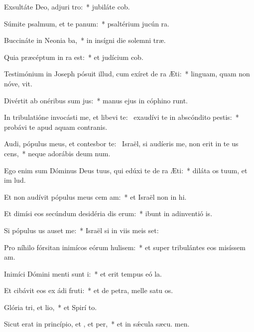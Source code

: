 \item Exsultáte Deo, adjuri tro:~* jubiláte  cob.
\item Súmite psalmum, et te panum:~* psaltérium jucún  ra.
\item Buccináte in Neonia ba,~* in insígni die solemni træ.
\item Quia præcéptum in ra est:~* et judícium  cob.
\item Testimónium in Joseph pósuit illud, cum exíret de ra Æti:~* linguam, quam non nóve, vit.
\item Divértit ab onéribus sum jus:~* manus ejus in cóphino runt.
\item In tribulatióne invocásti me, et libevi te:~\pscross{} exaudívi te in abscóndito pestis:~* probávi te apud aquam contranis.
\item Audi, pópulus meus, et contesbor te:~\pscross{} Israël, si audíeris me, non erit in te us cens,~* neque adorábis deum num.
\item Ego enim sum Dóminus Deus tuus, qui edúxi te de ra Æti:~* diláta os tuum, et im lud.
\item Et non audívit pópulus meus cem am:~* et Israël non in hi.
\item Et dimísi eos secúndum desidéria dis erum:~* ibunt in adinventió is.
\item Si pópulus us auset me:~* Israël si in viis meis set:
\item Pro níhilo fórsitan inimícos eórum hulisem:~* et super tribulántes eos misíssem  am.
\item Inimíci Dómini menti sunt i:~* et erit tempus eó  la.
\item Et cibávit eos ex ádi fruti:~* et de petra, melle satu os.
\item Glória tri, et lio,~* et Spirí to.
\item Sicut erat in princípio, et , et per,~* et in sǽcula sæcu. men.
